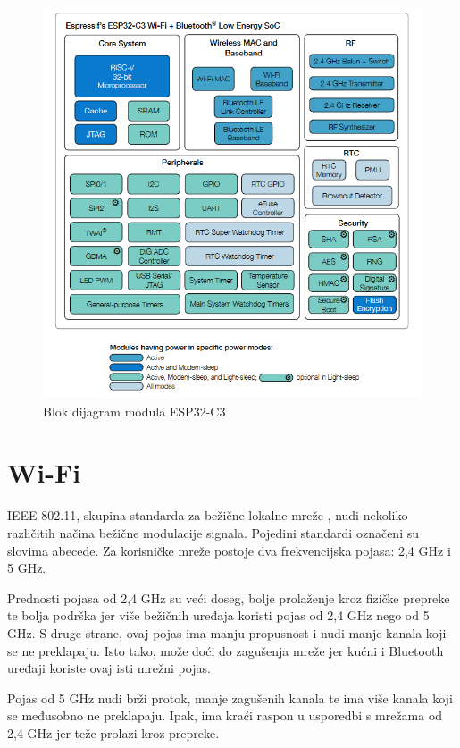 \begin{figure}[ht]
	\centering
	\includegraphics[scale=0.6]{imgs/esp32block}
	\caption{Blok dijagram modula ESP32-C3 \cite{esp32manual}}
	\label{fig:esp32block}
\end{figure}

\section{Wi-Fi}

IEEE 802.11, skupina standarda za bežične lokalne mreže  \cite{ieee}, nudi nekoliko različitih načina bežične modulacije signala. Pojedini standardi označeni su slovima abecede. Za korisničke mreže postoje dva frekvencijska pojasa: 2,4 GHz i 5 GHz. 

Prednosti pojasa od 2,4 GHz su veći doseg, bolje prolaženje kroz fizičke prepreke te bolja podrška jer više bežičnih uređaja koristi pojas od 2,4 GHz nego od 5 GHz. S druge strane, ovaj pojas ima manju propusnost i nudi manje kanala koji se ne preklapaju. Isto tako, može doći do zagušenja mreže jer kućni i Bluetooth uređaji koriste ovaj isti mrežni pojas.

Pojas od 5 GHz nudi brži protok, manje zagušenih kanala te ima više kanala koji se međusobno ne preklapaju. Ipak, ima kraći raspon u usporedbi s mrežama od 2,4 GHz jer teže prolazi kroz prepreke. \cite{microsoft_ieee} 

